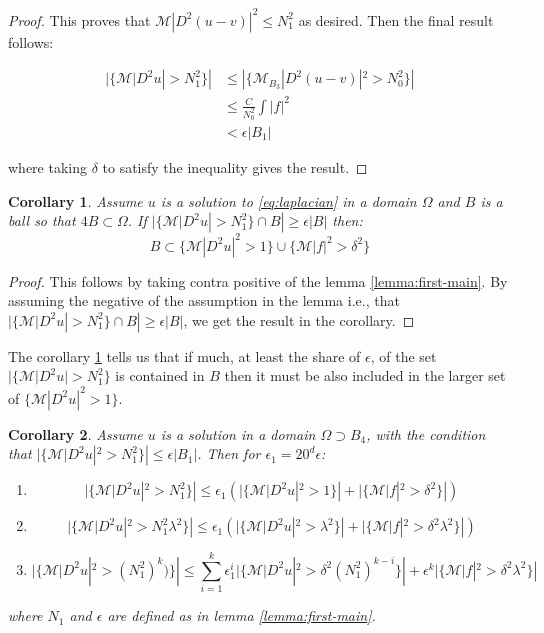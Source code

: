 \documentclass[12pt]{artikel1}
\newtheorem{corollary}{Corollary}[theorem]
\begin{document}
\begin{proof}
This proves that $\mathcal{M}|D^2(u-v)|^2\leq N_1^2$ as desired. Then the final result follows:

\begin{align*}
    |\{\mathcal{M}|D^2u|>N_1^2\}|&\leq|\{\mathcal{M}_{B_3}|D^2(u-v)|^2>N_0^2\}| \\
    &\leq\frac{C}{N_0^2}\int|f|^2 \\
    &<\epsilon|B_1|
\end{align*}
 
 \noindent where taking $\delta$ to satisfy the inequality gives the result.
\end{proof}

\begin{corollary}\label{cor:cor-first-main}
    Assume $u$ is a solution to \ref{eq:laplacian} in a domain $\Omega$ and $B$ is a ball so that $4B\subset\Omega$. If $|\{\mathcal{M}|D^2u|>N_1^2\}\cap B|\geq\epsilon|B|$ then:
    \begin{equation*}
        B\subset\{\mathcal{M}|D^2u|^2>1\}\cup\{\mathcal{M}|f|^2>\delta^2\}
    \end{equation*}
\end{corollary}
\begin{proof}
    This follows by taking contra positive of the lemma \ref{lemma:first-main}. By assuming the negative of the assumption in the lemma i.e., that $|\{\mathcal{M}|D^2u|>N_1^2\}\cap B|\geq\epsilon|B|$, we get the result in the corollary.
\end{proof}

The corollary \ref{cor:cor-first-main} tells us that if much, at least the share of $\epsilon$, of the set $|\{\mathcal{M}|D^2u|>N_1^2\}$ is contained in $B$ then it must be also included in the larger set of $\{\mathcal{M}|D^2u|^2>1\}$. 

\begin{corollary}\label{cor:cor-second-main}
    Assume $u$ is a solution in a domain $\Omega\supset B_4$, with the condition that $|\{\mathcal{M}|D^2u|^2>N_1^2\}|\leq\epsilon|B_1|$. Then for $\epsilon_1=20^d\epsilon$:
    \begin{enumerate}
        \item \begin{equation*}
            |\{\mathcal{M}|D^2u|^2>N_1^2\}|\leq\epsilon_1(|\{\mathcal{M}|D^2u|^2>1\}|+|\{\mathcal{M}|f|^2>\delta^2\}|)
        \end{equation*}
        \item \begin{equation*}
            |\{\mathcal{M}|D^2u|^2>N_1^2\lambda^2\}|\leq\epsilon_1(|\{\mathcal{M}|D^2u|^2>\lambda^2\}|+|\{\mathcal{M}|f|^2>\delta^2\lambda^2\}|)
        \end{equation*}
        \item \begin{equation*}
            |\{\mathcal{M}|D^2u|^2>(N^2_1)^k)\}|\leq\sum_{i=1}^k\epsilon_1^i|\{\mathcal{M}|D^2u|^2>\delta^2(N^2_1)^{k-i}\}|+\epsilon^k|\{\mathcal{M}|f|^2>\delta^2\lambda^2\}|
        \end{equation*}
    \end{enumerate}
    where $N_1$ and $\epsilon$ are defined as in lemma \ref{lemma:first-main}.
\end{corollary}
\end{document}
